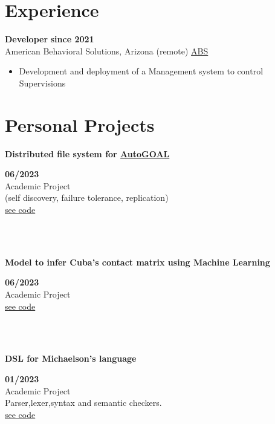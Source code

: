 \documentclass{article}
\begin{document}
\section*{Experience}
\begin{minipage}
    \textbf{Developer} \hfill \textbf{since 2021}\\
    American Behavioral Solutions, Arizona (remote)
    \href{americanbehavioralsolutions.com}{ABS}
    \begin{itemize}
        \item Development and deployment of a Management system to control Supervisions
    \end{itemize}
\end{minipage}

\section*{Personal Projects}
\begin{minipage}{0.8\textwidth}
\parbox{0.8\linewidth}{\textbf{Distributed file system for \href{https://autogoal.github.io/}{AutoGOAL}}}\hfill \textbf{06/2023} \\
Academic Project\\
(self discovery, failure tolerance, replication)\\
\href{https://github.com/geeksLabTech/kade-drive}{see code}\\
\end{minipage} \hfill {}\\\\
\begin{minipage}{0.8\textwidth}
\parbox{0.8\linewidth}{\textbf{Model to infer Cuba's contact matrix using Machine Learning}} \hfill \textbf{06/2023}\\
Academic Project\\
\href{https://github.com/geeksLabTech/epidemic-classification-ml-project}{see code}\\
\end{minipage} \hfill {}\\\\
\begin{minipage}{0.8\textwidth}
\parbox{0.8\linewidth}{\textbf{DSL for Michaelson's language}} \hfill \textbf{01/2023}\\
Academic Project\\
Parser,lexer,syntax and semantic checkers.\\
\href{https://github.com/geeksLabTech/compilation-dsl-project}{see code}\\
\end{minipage} \hfill {}\\\\
\end{document}
